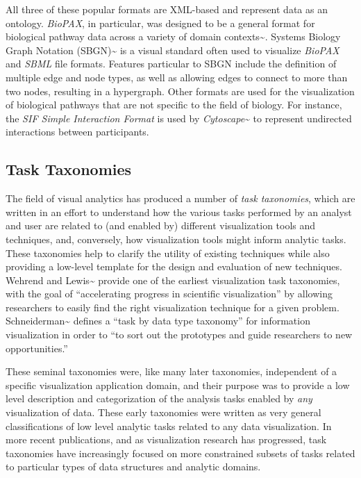 All three of these popular formats are XML-based and represent data as an ontology.
\emph{BioPAX}, in particular, was designed to be a general format for biological pathway data across a variety of domain contexts\textasciitilde{}\cite{demir2010biopax}.
Systems Biology Graph Notation (SBGN)\textasciitilde{}\cite{Novere2009} is a visual standard often used to visualize \textit{BioPAX} and \textit{SBML} file formats.
Features particular to SBGN include the definition of multiple edge and node types, as well as allowing edges to connect to more than two nodes, resulting in a hypergraph.
Other formats are used for the visualization of biological pathways that are not specific to the field of biology.
For instance, the \textit{SIF Simple Interaction Format} is used by \textit{Cytoscape}\textasciitilde{}\cite{Shannon2003cytoscape} to represent undirected interactions between participants.

\subsection*{Task Taxonomies}

The field of visual analytics has produced a number of \emph{task taxonomies}, which are written in an effort to understand how the various tasks performed by an analyst and user are related to (and enabled by) different visualization tools and techniques, and, conversely, how visualization tools might inform analytic tasks.
These taxonomies help to clarify the utility of existing techniques while also providing a low-level template for the design and evaluation of new techniques.
Wehrend and Lewis\textasciitilde{}\cite{Wehrend1990} provide one of the earliest visualization task taxonomies, with the goal of ``accelerating progress in scientific visualization'' by allowing researchers to easily find the right visualization technique for a given problem.
Schneiderman\textasciitilde{}\cite{Shneiderman1996} defines a ``task by data type taxonomy'' for information visualization in order to ``to sort out the prototypes and guide researchers to new opportunities.''

These seminal taxonomies were, like many later taxonomies, independent of a specific visualization application domain, and their purpose was to provide a low level description and categorization of the analysis tasks enabled by \textit{any} visualization of data.
These early taxonomies were written as very general classifications of low level analytic tasks related to any data visualization.
In more recent publications, and as visualization research has progressed, task taxonomies have increasingly focused on more constrained subsets of tasks related to particular types of data structures and analytic domains.

